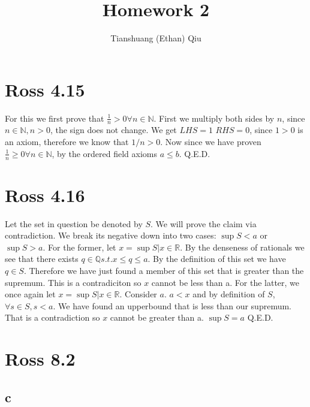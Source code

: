 \documentclass[12pt]{article}
\author{Tianshuang (Ethan) Qiu}
\newcommand{\N}{\mathbb{N}}
\newcommand{\R}{\mathbb{R}}
\newcommand{\Q}{\mathbb{Q}}
\begin{document}
\title{Homework 2}
\maketitle
\newpage

\section{Ross 4.15}
For this we first prove that $\frac{1}{n}>0 \forall n \in \N$. First we multiply both sides by $n$, since $n \in \N, n > 0$, the sign does not change.
\newline
We get $LHS = 1$ $RHS = 0$, since $1 > 0$ is an axiom, therefore we know that $1/n > 0$.
\newline
Now since we have proven $\frac{1}{n} \geq 0 \forall n \in \N$, by the ordered field axioms $a \leq b$.
\newline
Q.E.D.
\newpage


\section{Ross 4.16}
Let the set in question be denoted by $S$. We will prove the claim via contradiction. We break its negative down into two cases: $\sup S < a$ or $\sup S > a$.
\newline
For the former, let $x = \sup S | x \in \R$. By the denseness of rationals we see that there exists $q \in \Q s.t. x \leq q \leq a$. By the definition of this set we have $q \in S$. Therefore we have just found a member of this set that is greater than the supremum. This is a contradiciton so $x$ cannot be less than a.
\newline
For the latter, we once again let $x = \sup S | x \in \R$. Consider $a$. $a<x$ and by definition of $S$, $\forall s \in S, s<a$. We have found an upperbound that is less than our supremum. That is a contradiction so $x$ cannot be greater than a.
\newline
$\sup S = a$ Q.E.D.
\newpage

\section{Ross 8.2}
\subsection{c}
\end{document}
